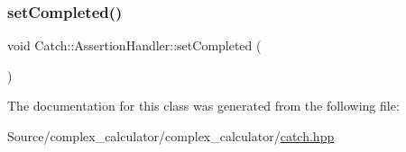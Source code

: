 \subsubsection{\texorpdfstring{set\+Completed()}{setCompleted()}}
{\footnotesize\ttfamily void Catch\+::\+Assertion\+Handler\+::set\+Completed (\begin{DoxyParamCaption}{ }\end{DoxyParamCaption})}



The documentation for this class was generated from the following file\+:\begin{DoxyCompactItemize}
\item 
Source/complex\+\_\+calculator/complex\+\_\+calculator/\mbox{\hyperlink{catch_8hpp}{catch.\+hpp}}\end{DoxyCompactItemize}
